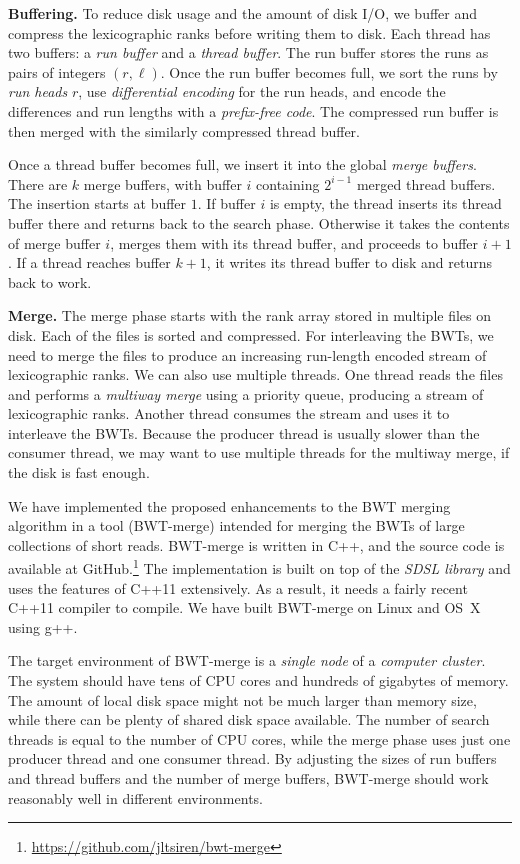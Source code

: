 \documentclass[smallabstract,smallcaptions]{dccpaper}
\newcommand{\BWT}{\textsf{BWT}}
\newcommand{\BWTmerge}{\textsf{BWT\nobreakdash-merge}}
\begin{document}
\smallbreak\noindent\textbf{Buffering.} To reduce disk usage and the amount of disk I/O, we buffer and compress the lexicographic ranks before writing them to disk. Each thread has two buffers: a \emph{run buffer} and a \emph{thread buffer}. The run buffer stores the runs as pairs of integers $(r, \ell)$. Once the run buffer becomes full, we sort the runs by \emph{run heads} $r$, use \emph{differential encoding} for the run heads, and encode the differences and run lengths with a \emph{prefix-free code}. The compressed run buffer is then merged with the similarly compressed thread buffer.

Once a thread buffer becomes full, we insert it into the global \emph{merge buffers}. There are $k$ merge buffers, with buffer $i$ containing $2^{i-1}$ merged thread buffers. The insertion starts at buffer $1$. If buffer $i$ is empty, the thread inserts its thread buffer there and returns back to the search phase. Otherwise it takes the contents of merge buffer $i$, merges them with its thread buffer, and proceeds to buffer $i+1$. If a thread reaches buffer $k+1$, it writes its thread buffer to disk and returns back to work.

\smallbreak\noindent\textbf{Merge.} The merge phase starts with the rank array stored in multiple files on disk. Each of the files is sorted and compressed. For interleaving the \BWT{}s, we need to merge the files to produce an increasing run-length encoded stream of lexicographic ranks. We can also use multiple threads. One thread reads the files and performs a \emph{multiway merge} using a priority queue, producing a stream of lexicographic ranks. Another thread consumes the stream and uses it to interleave the \BWT{}s. Because the producer thread is usually slower than the consumer thread, we may want to use multiple threads for the multiway merge, if the disk is fast enough.



We have implemented the proposed enhancements to the \BWT{} merging algorithm in a tool (\BWTmerge) intended for merging the \BWT{}s of large collections of short reads. \BWTmerge{} is written in C++, and the source code is available at GitHub.\footnote{\url{https://github.com/jltsiren/bwt-merge}} The implementation is built on top of the \emph{SDSL library} \cite{Gog2014b} and uses the features of C++11 extensively. As a result, it needs a fairly recent C++11 compiler to compile. We have built \BWTmerge{} on Linux and OS~X using g++.

The target environment of \BWTmerge{} is a \emph{single node} of a \emph{computer cluster}. The system should have tens of CPU cores and hundreds of gigabytes of memory. The amount of local disk space might not be much larger than memory size, while there can be plenty of shared disk space available. The number of search threads is equal to the number of CPU cores, while the merge phase uses just one producer thread and one consumer thread. By adjusting the sizes of run buffers and thread buffers and the number of merge buffers, \BWTmerge{} should work reasonably well in different environments.
\end{document}
